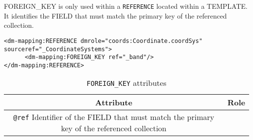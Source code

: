 FOREIGN\_KEY is only used within a \texttt{REFERENCE} located within a TEMPLATE.
It identifies the FIELD that must  match the primary key of the referenced collection.

\begin{lstlisting}[frame=single,caption={The \texttt{REFERENCE} is resolved by the \texttt{INSTANCE} of table \_CoordinateSystems that has a primary key equals to the value of the column  \_band},style=XML,basicstyle=\tiny]
<dm-mapping:REFERENCE dmrole="coords:Coordinate.coordSys" sourceref="_CoordinateSystems">
      <dm-mapping:FOREIGN_KEY ref="_band"/>
</dm-mapping:REFERENCE>
\end{lstlisting}

\begin{table}[!htbp]
\small
\centering
\begin{tabulary}{\linewidth}{|c|J|}       
       \hline 
            \textbf{Attribute} & 
            \textbf {Role}\\
       \hline         \hline  
             \texttt{@ref}  
             Identifier of the FIELD that must  match the primary key of the referenced collection \\
     \hline
     \end{tabulary}
     \caption{\texttt{FOREIGN\_KEY} attributes} 
     \label{tbl:foreignkey-att}
 \end{table}
